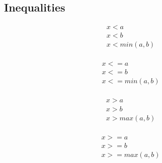 \subsection{Inequalities}

\begin{equation}
        \begin{array}{c}
                x < a \\
                x < b \\
                x < min(a, b) \\
        \end{array}
\end{equation}

\begin{equation}
        \begin{array}{c}
                x <= a \\
                x <= b \\
                x <= min(a, b) \\
        \end{array}
\end{equation}

\begin{equation}
        \begin{array}{c}
                x > a \\
                x > b \\
                x > max(a, b) \\
        \end{array}
\end{equation}

\begin{equation}
        \begin{array}{c}
                x >= a \\
                x >= b \\
                x >= max(a, b) \\
        \end{array}
\end{equation}
